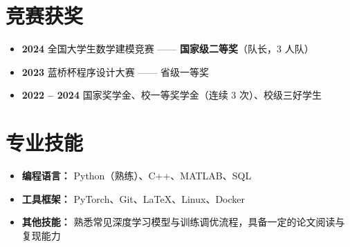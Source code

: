 \documentclass[a4paper,11pt]{article}
\begin{document}
\section{竞赛获奖}
\begin{itemize}
    \item \textbf{2024} 全国大学生数学建模竞赛 —— \textbf{国家级二等奖}（队长，3 人队）
    \item \textbf{2023} 蓝桥杯程序设计大赛 —— 省级一等奖
    \item \textbf{2022 -- 2024} 国家奖学金、校一等奖学金（连续 3 次）、校级三好学生
\end{itemize}

\section{专业技能}
\begin{itemize}
    \item \textbf{编程语言：} Python（熟练）、C++、MATLAB、SQL
    \item \textbf{工具框架：} PyTorch、Git、LaTeX、Linux、Docker
    \item \textbf{其他技能：} 熟悉常见深度学习模型与训练调优流程，具备一定的论文阅读与复现能力
\end{itemize}

\end{document}
